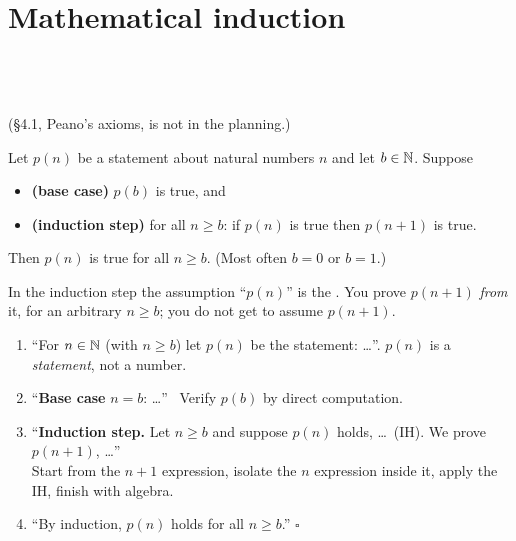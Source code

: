 \chapter{Mathematical induction}
%
{\\ \\ \\ (\S4.1, Peano's axioms, is not in the planning.)}


\begin{result}
Let $p(n)$ be a statement about natural numbers $n$ and let $b\in\mathbb{N}$. Suppose
\begin{itemize}
\item \textbf{(base case)} $p(b)$ is true, and
\item \textbf{(induction step)} for all $n\ge b$: if $p(n)$ is true then $p(n+1)$ is true.
\end{itemize}
Then $p(n)$ is true for all $n\ge b$. (Most often $b=0$ or $b=1$.)
\end{result}
In the induction step the assumption ``$p(n)$'' is the . You prove $p(n+1)$ \emph{from} it, for an arbitrary $n\ge b$; you do not get to assume $p(n+1)$.

\begin{strategy}
\begin{enumerate}
\item ``For $n\in\mathbb{N}$ (with $n\ge b$) let $p(n)$ be the statement: \dots''. \quad $p(n)$ is a \emph{statement}, not a number.
\item ``\textbf{Base case} $n=b$: \dots'' \ Verify $p(b)$ by direct computation.
\item ``\textbf{Induction step.} Let $n\ge b$ and suppose $p(n)$ holds, \ie \dots\ (IH). We prove $p(n+1)$, \ie \dots''\\
   Start from the $n+1$ expression, isolate the $n$ expression inside it, apply the IH, finish with algebra.
\item ``By induction, $p(n)$ holds for all $n\ge b$.'' $\square$
\end{enumerate}
\end{strategy}

